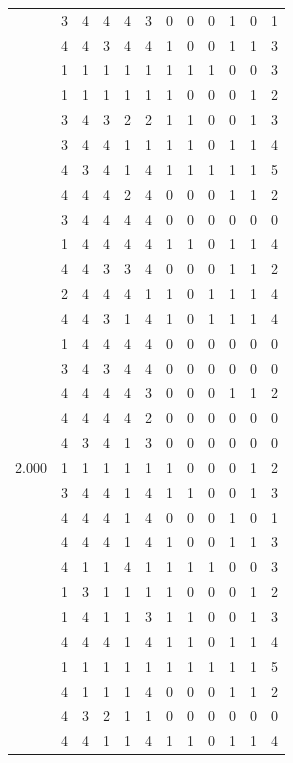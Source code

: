 \documentclass[]{book}
\theoremstyle{definition}
\theoremstyle{definition}
\theoremstyle{definition}
\theoremstyle{remark}
\begin{document}
\begin{table}
{\begin{tabular}[t]{rrrrrrrrrrrr}
 & 3 & 4 & 4 & 4 & 3 & 0 & 0 & 0 & 1 & 0 & 1\\
 & 4 & 4 & 3 & 4 & 4 & 1 & 0 & 0 & 1 & 1 & 3\\
 & 1 & 1 & 1 & 1 & 1 & 1 & 1 & 1 & 0 & 0 & 3\\
 & 1 & 1 & 1 & 1 & 1 & 1 & 0 & 0 & 0 & 1 & 2\\
 & 3 & 4 & 3 & 2 & 2 & 1 & 1 & 0 & 0 & 1 & 3\\
 & 3 & 4 & 4 & 1 & 1 & 1 & 1 & 0 & 1 & 1 & 4\\
 & 4 & 3 & 4 & 1 & 4 & 1 & 1 & 1 & 1 & 1 & 5\\
 & 4 & 4 & 4 & 2 & 4 & 0 & 0 & 0 & 1 & 1 & 2\\
 & 3 & 4 & 4 & 4 & 4 & 0 & 0 & 0 & 0 & 0 & 0\\
 & 1 & 4 & 4 & 4 & 4 & 1 & 1 & 0 & 1 & 1 & 4\\
 & 4 & 4 & 3 & 3 & 4 & 0 & 0 & 0 & 1 & 1 & 2\\
 & 2 & 4 & 4 & 4 & 1 & 1 & 0 & 1 & 1 & 1 & 4\\
 & 4 & 4 & 3 & 1 & 4 & 1 & 0 & 1 & 1 & 1 & 4\\
 & 1 & 4 & 4 & 4 & 4 & 0 & 0 & 0 & 0 & 0 & 0\\
 & 3 & 4 & 3 & 4 & 4 & 0 & 0 & 0 & 0 & 0 & 0\\
 & 4 & 4 & 4 & 4 & 3 & 0 & 0 & 0 & 1 & 1 & 2\\
 & 4 & 4 & 4 & 4 & 2 & 0 & 0 & 0 & 0 & 0 & 0\\
 & 4 & 3 & 4 & 1 & 3 & 0 & 0 & 0 & 0 & 0 & 0\\
2.000 & 1 & 1 & 1 & 1 & 1 & 1 & 0 & 0 & 0 & 1 & 2\\
 & 3 & 4 & 4 & 1 & 4 & 1 & 1 & 0 & 0 & 1 & 3\\
 & 4 & 4 & 4 & 1 & 4 & 0 & 0 & 0 & 1 & 0 & 1\\
 & 4 & 4 & 4 & 1 & 4 & 1 & 0 & 0 & 1 & 1 & 3\\
 & 4 & 1 & 1 & 4 & 1 & 1 & 1 & 1 & 0 & 0 & 3\\
 & 1 & 3 & 1 & 1 & 1 & 1 & 0 & 0 & 0 & 1 & 2\\
 & 1 & 4 & 1 & 1 & 3 & 1 & 1 & 0 & 0 & 1 & 3\\
 & 4 & 4 & 4 & 1 & 4 & 1 & 1 & 0 & 1 & 1 & 4\\
 & 1 & 1 & 1 & 1 & 1 & 1 & 1 & 1 & 1 & 1 & 5\\
 & 4 & 1 & 1 & 1 & 4 & 0 & 0 & 0 & 1 & 1 & 2\\
 & 4 & 3 & 2 & 1 & 1 & 0 & 0 & 0 & 0 & 0 & 0\\
 & 4 & 4 & 1 & 1 & 4 & 1 & 1 & 0 & 1 & 1 & 4\\

\end{tabular}}
\end{table}
\end{document}
